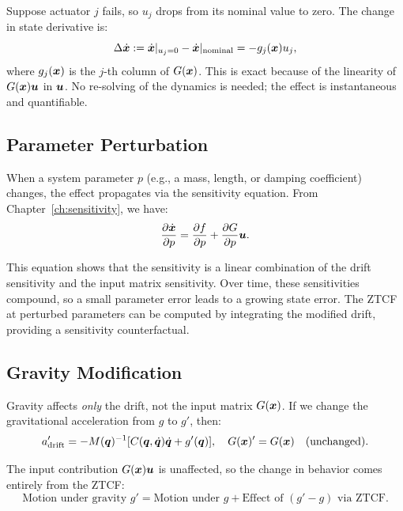 Suppose actuator $j$ fails, so $u_j$ drops from its nominal value to zero. The change in
state derivative is:
\begin{equation}
\Delta \dot{\bm{x}} := \dot{\bm{x}}|_{u_j=0} - \dot{\bm{x}}|_{\text{nominal}} = -g_j(\bm{x}) u_j,
\label{eq:ch7:actuator-failure}
\end{equation}
where $g_j(\bm{x})$ is the $j$-th column of $G(\bm{x})$. This is exact because of the linearity
of $G(\bm{x})\bm{u}$ in $\bm{u}$. No re-solving of the dynamics is needed; the effect is
instantaneous and quantifiable.

\subsection{Parameter Perturbation}

When a system parameter $p$ (e.g., a mass, length, or damping coefficient) changes, the
effect propagates via the sensitivity equation. From Chapter~\ref{ch:sensitivity}, we have:
\begin{equation}
\frac{\partial \dot{\bm{x}}}{\partial p} = \frac{\partial f}{\partial p} + \frac{\partial G}{\partial p}\bm{u}.
\label{eq:ch7:sensitivity-eq}
\end{equation}

This equation shows that the sensitivity is a linear combination of the drift sensitivity
and the input matrix sensitivity. Over time, these sensitivities compound, so a small
parameter error leads to a growing state error. The ZTCF at perturbed parameters can be
computed by integrating the modified drift, providing a sensitivity counterfactual.

\subsection{Gravity Modification}

Gravity affects \emph{only} the drift, not the input matrix $G(\bm{x})$. If we change the
gravitational acceleration from $g$ to $g'$, then:
\begin{equation}
a_{\text{drift}}' = -M(\bm{q})^{-1}[C(\bm{q},\dot{\bm{q}})\dot{\bm{q}} + g'(\bm{q})],
\quad
G(\bm{x})' = G(\bm{x}) \quad \text{(unchanged)}.
\label{eq:ch7:gravity-counterfactual}
\end{equation}

The input contribution $G(\bm{x})\bm{u}$ is unaffected, so the change in behavior comes entirely
from the ZTCF:
\begin{equation}
\text{Motion under gravity } g' = \text{Motion under } g + \text{Effect of } (g' - g) \text{ via ZTCF}.
\end{equation}

